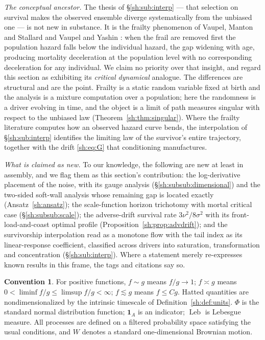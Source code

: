 \documentclass[11pt]{article}
\numberwithin{equation}{section}
\theoremstyle{plain}
\theoremstyle{definition}
\newtheorem{convention}[theorem]{Convention}
\theoremstyle{remark}
\DeclareMathOperator{\Leb}{Leb}
\newcommand{\one}{\mathbf{1}}
\begin{document}
\emph{The conceptual ancestor.} The thesis of \S\ref{sh:sub:interp} ---
that selection on survival makes the observed ensemble diverge
systematically from the unbiased one --- is not new in substance. It is
the frailty phenomenon of Vaupel, Manton and Stallard \cite{VMS79} and
Vaupel and Yashin \cite{VY85}: when the frail are removed first the
population hazard falls below the individual hazard, the gap widening
with age, producing mortality deceleration at the population level with
no corresponding deceleration for any individual. We claim no priority
over that insight, and regard this section as exhibiting its
\emph{critical dynamical} analogue. The differences are structural and
are the point. Frailty is a static random variable fixed at birth and the
analysis is a mixture computation over a population; here the randomness
is a driver evolving in time, and the object is a limit of path measures
singular with respect to the unbiased law
(Theorem~\ref{sh:thm:singular}). Where the frailty literature computes
how an observed hazard curve bends, the interpolation of
\S\ref{sh:sub:interp} identifies the limiting law of the survivor's
entire trajectory, together with the drift \eqref{sh:eq:G} that
conditioning manufactures.

\emph{What is claimed as new.} To our knowledge, the following are new
at least in assembly, and we flag them as this section's contribution:
the log-derivative placement of the noise, with its gauge analysis
(\S\ref{sh:subsub:dimensional}) and the two-sided soft-wall analysis
whose remaining gap is located exactly (Ansatz~\ref{sh:ansatz}); the
scale-function horizon trichotomy with mortal critical case
(\S\ref{sh:subsub:scale}); the adverse-drift survival rate
$3\nu^2/8\sigma^2$ with its front-load-and-coast optimal profile
(Proposition~\ref{sh:prop:advdrift}); and the survivorship
interpolation read as a monotone flow with the tail index as its
linear-response coefficient, classified across drivers into saturation,
transformation and concentration (\S\ref{sh:sub:interp}). Where a
statement merely re-expresses known results in this frame, the tags and
citations say so.

\begin{convention}\label{sh:conv}
For positive functions, $f\sim g$ means $f/g\to1$; $f\asymp g$ means
$0<\liminf f/g\le\limsup f/g<\infty$; $f\lesssim g$ means $f\le Cg$.
Hatted quantities are nondimensionalized by the intrinsic timescale of
Definition~\ref{sh:def:units}. $\Phi$ is the standard normal distribution
function; $\one_A$ is an indicator; $\Leb$ is Lebesgue measure. All processes
are defined on a filtered probability space satisfying the usual conditions,
and $W$ denotes a standard one-dimensional Brownian motion.
\end{convention}
\end{document}
